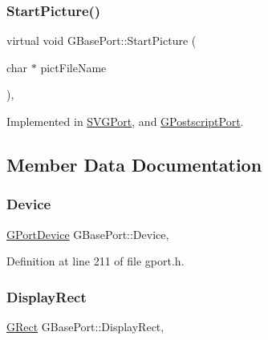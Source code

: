 \subsubsection{\texorpdfstring{Start\+Picture()}{StartPicture()}}
{\footnotesize\ttfamily virtual void G\+Base\+Port\+::\+Start\+Picture (\begin{DoxyParamCaption}\item[{char $\ast$}]{pict\+File\+Name }\end{DoxyParamCaption})\hspace{0.3cm}{\ttfamily [pure virtual]}, {\ttfamily [inherited]}}



Implemented in \mbox{\hyperlink{class_s_v_g_port_a930228d552d729c5aeb0aa8fb731d303}{S\+V\+G\+Port}}, and \mbox{\hyperlink{class_g_postscript_port_a4c9faebb953228964ca032e75ed40bcc}{G\+Postscript\+Port}}.



\subsection{Member Data Documentation}
\mbox{\label{class_g_base_port_a14275a027c8665d5fa4941e148a1b46a}} 
\subsubsection{\texorpdfstring{Device}{Device}}
{\footnotesize\ttfamily \mbox{\hyperlink{gport_8h_a595e501a3b83fde14c760260fbfb153f}{G\+Port\+Device}} G\+Base\+Port\+::\+Device\hspace{0.3cm}{\ttfamily [protected]}, {\ttfamily [inherited]}}



Definition at line 211 of file gport.\+h.

\mbox{\label{class_g_base_port_ac0e1180ebadeed5d3c7d0291db1bdf29}} 
\subsubsection{\texorpdfstring{Display\+Rect}{DisplayRect}}
{\footnotesize\ttfamily \mbox{\hyperlink{class_g_rect}{G\+Rect}} G\+Base\+Port\+::\+Display\+Rect\hspace{0.3cm}{\ttfamily [protected]}, {\ttfamily [inherited]}}



